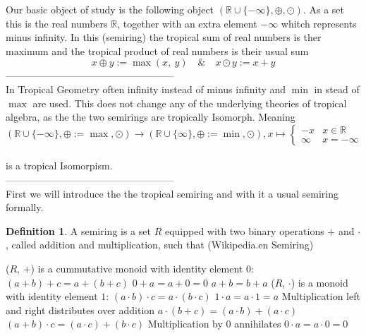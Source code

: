 \documentclass{article}
\theoremstyle{definition}
\newtheorem{definition}[theorem]{Definition}
\begin{document}
Our basic object of study is the following object $( \mathbb{R} \cup \{- \infty \} , \oplus , \odot )$. As a set this is the real numbers $ \mathbb{R} $, together with an extra element $- \infty $ whitch represents minus infinity. In this (semiring) the tropical sum of real numbers is ther maximum and the tropical product of real numbers is their usual sum 
$$ x \oplus y := \max(x,\ y) \quad \& \quad x \odot y := x+y$$
--------------------------------------------------- \\
In Tropical Geometry often infinity instead of minus infinity and $\min$ in stead of $\max$ are used. This does not change any of the underlying theories of tropical algebra, as the the two semirings are tropically Isomorph. Meaning 
$$( \mathbb{R} \cup \{- \infty \} , \oplus := \max, \odot ) \to ( \mathbb{R} \cup \{ \infty \} , \oplus := \min , \odot ), x \mapsto \begin{cases} 
-x & x \in \mathbb{R}\\
\infty & x = - \infty
\end{cases}$$\\
is a tropical Isomorpism. \\
--------------------------------------------------- \\
First we will introduce the the tropical semiring and with it a usual semiring formally.
\begin{definition}
A semiring is a set $R$ equipped with two binary operations $+$ and $\cdot$, called addition and multiplication, such that (Wikipedia.en Semiring)
\begin{outline}
  \1 ($R$, $+$) is a cummutative monoid with identity element 0:
    \2 $(a + b) + c = a + (b + c)$
    \2 $0 + a = a + 0 = 0$
    \2 $a + b = b + a$
  \1 ($R$, $\cdot$) is a monoid with identity element $1$:
    \2 $(a \cdot b) \cdot c = a \cdot (b \cdot c)$
    \2 $ 1 \cdot a = a \cdot 1 = a $
  \1 Multiplication left and right distributes over addition
    \2 $ a \cdot (b + c) = (a \cdot b) + (a \cdot c)$
    \2 $ (a + b) \cdot c = (a \cdot c) + (b \cdot c)$
  \1 Multiplication by 0 annihilates
    \2 $ 0 \cdot a = a \cdot 0 = 0$
\end{outline}
\end{definition}
\end{document}
